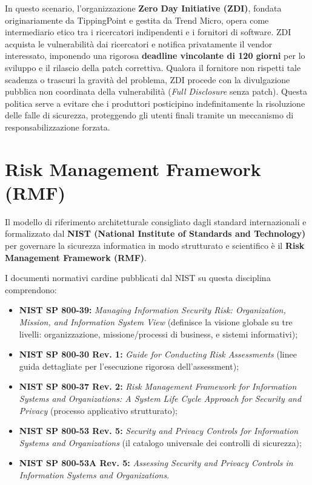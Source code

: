 \documentclass[../../main.tex]{subfiles}
\begin{document}
In questo scenario, l'organizzazione \textbf{Zero Day Initiative (ZDI)}, fondata originariamente da TippingPoint e gestita da Trend Micro, opera come intermediario etico tra i ricercatori indipendenti e i fornitori di software. ZDI acquista le vulnerabilità dai ricercatori e notifica privatamente il vendor interessato, imponendo una rigorosa \textbf{deadline vincolante di 120 giorni} per lo sviluppo e il rilascio della patch correttiva. Qualora il fornitore non rispetti tale scadenza o trascuri la gravità del problema, ZDI procede con la divulgazione pubblica non coordinata della vulnerabilità (\textit{Full Disclosure} senza patch). Questa politica serve a evitare che i produttori posticipino indefinitamente la risoluzione delle falle di sicurezza, proteggendo gli utenti finali tramite un meccanismo di responsabilizzazione forzata.

\section{Risk Management Framework (RMF)}
\label{sec:rmf}

Il modello di riferimento architetturale consigliato dagli standard internazionali e formalizzato dal \textbf{NIST (National Institute of Standards and Technology)} per governare la sicurezza informatica in modo strutturato e scientifico è il \textbf{Risk Management Framework (RMF)}.

I documenti normativi cardine pubblicati dal NIST su questa disciplina comprendono:
\begin{itemize}
    \item \textbf{NIST SP 800-39:} \textit{Managing Information Security Risk: Organization, Mission, and Information System View} (definisce la visione globale su tre livelli: organizzazione, missione/processi di business, e sistemi informativi);
    \item \textbf{NIST SP 800-30 Rev. 1:} \textit{Guide for Conducting Risk Assessments} (linee guida dettagliate per l'esecuzione rigorosa dell'assessment);
    \item \textbf{NIST SP 800-37 Rev. 2:} \textit{Risk Management Framework for Information Systems and Organizations: A System Life Cycle Approach for Security and Privacy} (processo applicativo strutturato);
    \item \textbf{NIST SP 800-53 Rev. 5:} \textit{Security and Privacy Controls for Information Systems and Organizations} (il catalogo universale dei controlli di sicurezza);
    \item \textbf{NIST SP 800-53A Rev. 5:} \textit{Assessing Security and Privacy Controls in Information Systems and Organizations}.
\end{itemize}
\end{document}
